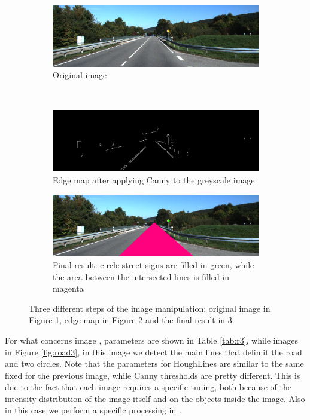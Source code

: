 \documentclass[twoside,onecolumn]{article}
\theoremstyle{definition}
\begin{document}
\begin{figure} \centering
\begin{subfigure}{0.8\textwidth}
  \includegraphics[width=\textwidth]{figs/road2.png}
\caption{Original image }\label{fig:r2fig}
\end{subfigure} \\
\begin{subfigure}{0.8\textwidth}
\includegraphics[width=\textwidth]{figs/edgeMap_road2.png}
\caption{Edge map after applying Canny to the greyscale image}\label{fig:r2edges}
\end{subfigure}
  \begin{subfigure}{0.8\textwidth}
\includegraphics[width=\textwidth]{figs/Circles_road2.png}
\caption{Final result: circle street signs are filled in green, while the area between the intersected lines is filled in magenta}\label{fig:r2circles}
\end{subfigure}\caption{Three different steps of the image manipulation: original image in Figure \ref{fig:r2fig}, edge map in Figure \ref{fig:r2edges} and the final result in \ref{fig:r2circles}. }\label{fig:road2}
\end{figure}

For what concerns image , parameters are shown in Table \ref{tab:r3}, while images in Figure \ref{fig:road3}, in this image we detect the main lines that delimit the road and two circles. Note that the parameters for HoughLines are similar to the same fixed for the previous image, while Canny thresholds are pretty different. This is due to the  fact that each image requires a specific tuning, both because of the intensity distribution of the image itself and on the objects inside the image. Also in this case we perform a specific processing in .
\end{document}
